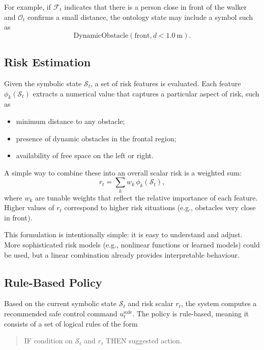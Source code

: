 \documentclass{article}
\begin{document}
For example, if $\mathcal{F}_t$ indicates that there is a person close in front of the walker and $\mathcal{O}_t$ confirms a small distance, the ontology state may include a symbol such as
\begin{equation}
    \text{DynamicObstacle} (\text{front}, d < 1.0~\text{m}).
\end{equation}

\subsection{Risk Estimation}

Given the symbolic state $\mathcal{S}_t$, a set of risk features is evaluated. Each feature $\phi_k(\mathcal{S}_t)$ extracts a numerical value that captures a particular aspect of risk, such as
\begin{itemize}
    \item minimum distance to any obstacle;
    \item presence of dynamic obstacles in the frontal region;
    \item availability of free space on the left or right.
\end{itemize}

A simple way to combine these into an overall scalar risk is a weighted sum:
\begin{equation}
    r_t = \sum_k w_k\, \phi_k(\mathcal{S}_t),
\end{equation}
where $w_k$ are tunable weights that reflect the relative importance of each feature. Higher values of $r_t$ correspond to higher risk situations (e.g., obstacles very close in front).

This formulation is intentionally simple: it is easy to understand and adjust. More sophisticated risk models (e.g., nonlinear functions or learned models) could be used, but a linear combination already provides interpretable behaviour.

\subsection{Rule-Based Policy}

Based on the current symbolic state $\mathcal{S}_t$ and risk scalar $r_t$, the system computes a recommended safe control command $u_t^{\text{safe}}$. The policy is rule-based, meaning it consists of a set of logical rules of the form
\begin{quote}
    IF condition on $\mathcal{S}_t$ and $r_t$ THEN suggested action.
\end{quote}
\end{document}
